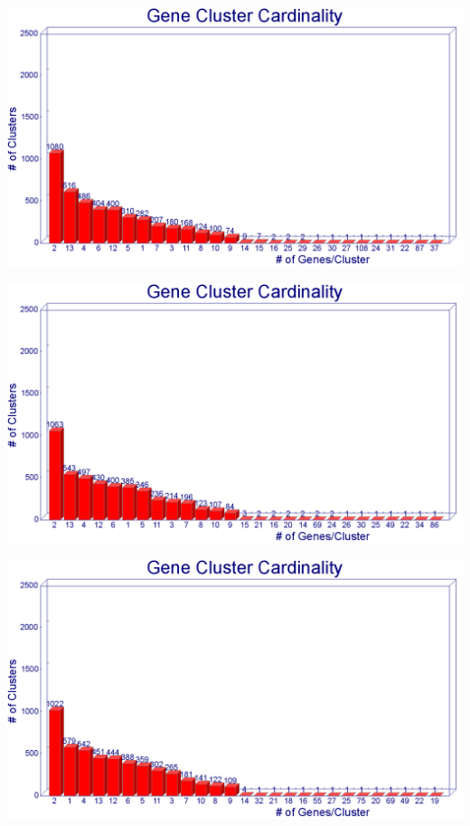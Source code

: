 \documentclass[11pt,notitlepage]{article}
\begin{document}
  \includegraphics[width=145mm]{i75_a50_graph.png}
  
  \includegraphics[width=145mm]{i75_a70_graph.png}
  
  \includegraphics[width=145mm]{i75_a90_graph.png}
  
\end{document}
